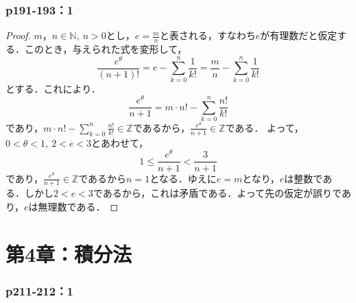 \documentclass[a4paper,10pt,fleqn]{ltjsarticle}
\begin{document}
\section*{p191-193：1}


\begin{tleftbar}
    \begin{proof}
        $m，n \in \mathbb{N},~n >0$とし，$e=\frac{m}{n}$と表される，すなわち$e$が有理数だと仮定する．このとき，与えられた式を変形して，
        \[
            \frac{e^\theta}{(n+1)!} = e-\sum_{k=0}^{n} \frac{1}{k!} =\frac{m}{n}-\sum_{k=0}^{n} \frac{1}{k!}
        \]
        とする．これにより．
        \[
            \frac{e^{\theta}}{n+1} = m \cdot n! - \sum_{k=0}^{n} \frac{n!}{k!}
        \]
        であり，$m \cdot n! - \sum_{k=0}^{n} \frac{n!}{k!} \in \mathbb{Z}$であるから，$\frac{e^{\theta}}{n+1} \in \mathbb{Z}$である．
        よって，$0< \theta <1,~2<e<3$とあわせて，
        \[
            1 \le \frac{e^{\theta}}{n+1} < \frac{3}{n+1}
        \]
        であり，$\frac{e^{\theta}}{n+1} \in \mathbb{Z}$であるから$n=1$となる．ゆえに$e=m$となり，$e$は整数である．しかし$2<e<3$であるから，これは矛盾である．よって先の仮定が誤りであり，$e$は無理数である．
    \end{proof}
\end{tleftbar}
\newpage 

\part*{第4章：積分法}



\section*{p211-212：1}
\end{document}
